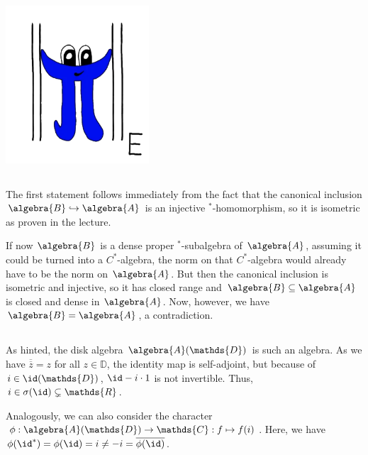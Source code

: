 \documentclass[a4paper]{article}
\begin{document}
\makeexheader

\begin{center}
    \includegraphics*[width=0.4\textwidth]{pi.png}
\end{center}

\subsection{}

The first statement follows immediately from the fact that the canonical inclusion $\algebra{B} \hookrightarrow \algebra{A}$ is an injective $^*$-homomorphism, so it is isometric as proven in the lecture.

If now $\algebra{B}$ is a dense proper $^*$-subalgebra of $\algebra{A}$, assuming it could be turned into a $C^*$-algebra, the norm on that $C^*$-algebra would already have to be the norm on $\algebra{A}$.
But then the canonical inclusion is isometric and injective, so it has closed range and $\algebra{B} \subseteq \algebra{A}$ is closed and dense in $\algebra{A}$.
Now, however, we have $\algebra{B} = \algebra{A}$, a contradiction.

\subsection{}

As hinted, the disk algebra $\algebra{A}(\mathds{D})$ is such an algebra.
As we have $\overline{\overline{z}} = z$ for all $z \in \mathds{D}$, the identity map is self-adjoint, but because of $i \in \id(\mathds{D})$, $\id - i \cdot 1$ is not invertible.
Thus, $i \in \sigma(\id) \subsetneq \mathds{R}$.

Analogously, we can also consider the character $\phi: \algebra{A}(\mathds{D}) \to \mathds{C}: f \mapsto f(i)$.
Here, we have $\phi(\id^*) = \phi(\id) = i \neq - i = \overline{\phi(\id)}$.
\end{document}
